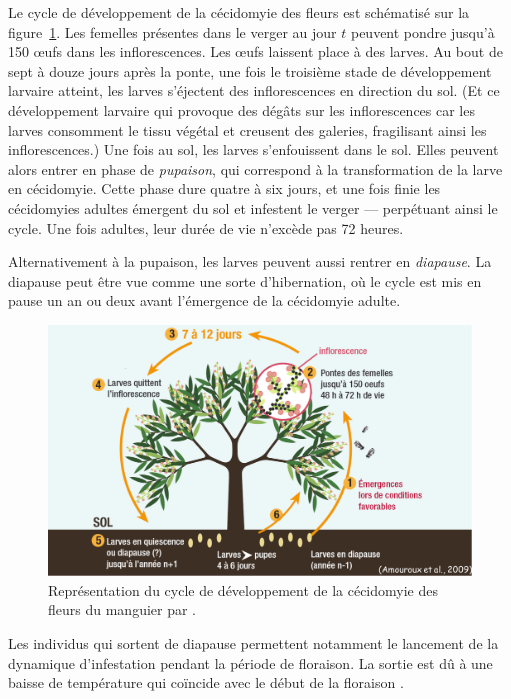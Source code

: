 Le cycle de développement de la cécidomyie des fleurs est schématisé sur la figure~\ref{fig:cycle}.
Les femelles présentes dans le verger au jour $t$ peuvent pondre jusqu'à 150 œufs dans les inflorescences.
Les œufs laissent place à des larves.
Au bout de sept à douze jours après la ponte, une fois le troisième stade de développement larvaire atteint, les larves s'éjectent des inflorescences en direction du sol.
(Et ce développement larvaire qui provoque des dégâts sur les inflorescences car les larves consomment le tissu végétal et creusent des galeries, fragilisant ainsi les inflorescences.)
Une fois au sol, les larves s'enfouissent dans le sol. 
Elles peuvent alors entrer en phase de \emph{pupaison}, qui correspond à la transformation de la larve en cécidomyie.
Cette phase dure quatre à six jours, et une fois finie les cécidomyies adultes émergent du sol et infestent le verger --- perpétuant ainsi le cycle. 
Une fois adultes, leur durée de vie n'excède pas 72 heures.

Alternativement à la pupaison, les larves peuvent aussi rentrer en \emph{diapause}.
La diapause peut être vue comme une sorte d'hibernation, où le cycle est mis en pause un an ou deux avant l'émergence de la cécidomyie adulte.


%
\begin{figure}
 \centering
 \includegraphics[scale = 0.33]{photos/cycle.png}
 \caption{Représentation du cycle de développement de la cécidomyie des fleurs du manguier par \citet{paulguide}.}
 \label{fig:cycle}
\end{figure}
%


Les individus qui sortent de diapause permettent notamment le lancement de la dynamique d'infestation pendant la période de floraison.
La sortie est dû à une baisse de température qui coïncide avec le début de la floraison \citep{pauldiap}.
























